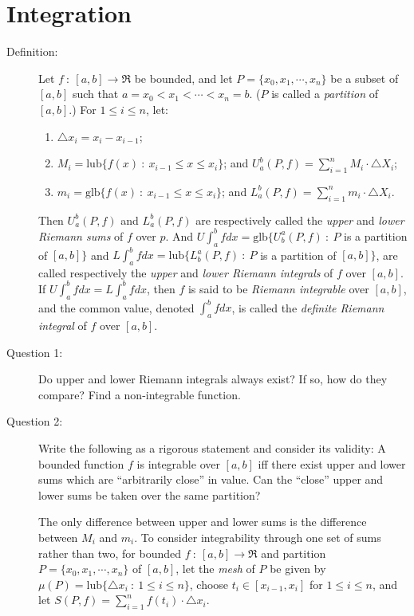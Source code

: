 \documentclass{article}
\begin{document}
\newpage

\section{Integration}

\begin{description}

  \item[Definition:] Let $f\ :\ [a,b] \to \Re$ be bounded, and let $P = \{ x_0, x_1, \cdots, x_n \}$ be a subset of $[a,b]$ such that $a = x_0 < x_1 < \cdots < x_n = b$. ($P$ is called a \emph{partition} of $[a,b]$.) For $1 \leq i \leq n$, let:
    \begin{enumerate}[\hspace{1cm}(1)]
      \item $\triangle x_i = x_i - x_{i-1}$;
      \item $M_i = \text{lub} \{ f(x)\ :\ x_{i-1} \leq x \leq x_i \}$; and $\displaystyle U_a^b (P,f) = \sum_{i=1}^n M_i \cdot \triangle X_i$;
      \item $m_i = \text{glb} \{ f(x)\ :\ x_{i-1} \leq x \leq x_i \}$; and $\displaystyle L_a^b (P,f) = \sum_{i=1}^n m_i \cdot \triangle X_i$.
    \end{enumerate}
    Then $U_a^b (P,f)$ and $L_a^b (P,f)$ are respectively called the \emph{upper} and \emph{lower Riemann sums} of $f$ over $p$. And $U \int_a^b f dx = \text{glb} \{ U_b^a (P,f)\ :\ P$ is a partition of $[a,b] \}$ and $L \int_a^b f dx = \text{lub} \{ L_b^a (P,f)\ :\ P$ is a partition of $[a,b] \}$, are called respectively the \emph{upper} and \emph{lower Riemann integrals} of $f$ over $[a,b]$. If $U \int_a^b f dx = L \int_a^b f dx$, then $f$ is said to be \emph{Riemann integrable} over $[a,b]$, and the common value, denoted $\int_a^b f dx$, is called the \emph{definite Riemann integral} of $f$ over $[a,b]$.

  \item[Question 1:] Do upper and lower Riemann integrals always exist? If so, how do they compare? Find a non-integrable function.

  \item[Question 2:] Write the following as a rigorous statement and consider its validity: A bounded function $f$ is integrable over $[a,b]$ iff there exist upper and lower sums which are ``arbitrarily close'' in value. Can the ``close'' upper and lower sums be taken over the same partition?

  \item[] The only difference between upper and lower sums is the difference between $M_i$ and $m_i$. To consider integrability through one set of sums rather than two, for bounded $f\ :\ [a,b] \to \Re$ and partition $P = \{ x_0, x_1, \cdots, x_n \}$ of $[a,b]$, let the \emph{mesh} of $P$ be given by $\mu(P) = \text{lub} \{ \triangle x_i\ :\ 1 \leq i \leq n \}$, choose $t_i \in [x_{i-1},x_i]$ for $1 \leq i \leq n$, and let $\displaystyle S(P,f) = \sum_{i=1}^n f(t_i) \cdot \triangle x_i$.


\end{description}
\end{document}
